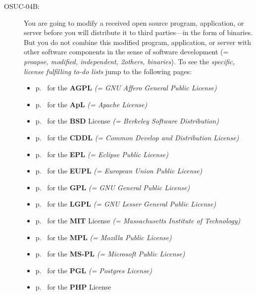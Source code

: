 \begin{description}
\item[OSUC-04B:]\label{OSUC-04B-DEF} You are going to modify a received open
source program, application, or server before you will distribute it to third
parties---in the form of binaries. But you do not combine this modified
program, application, or server with other software components in the sense of
software development (= \textit{proapse, modified, independent, 2others,
binaries}). To see the \textit{specific, license fulfilling to-do lists} jump to
the following pages:
  \begin{itemize}
    \item p.\ \pageref{OSUC-04B-AGPL} for the \textbf{AGPL}
      \textit{(= GNU Affero General Public License)} 
    \item p.\ \pageref{OSUC-04B-Apache20} for the \textbf{ApL}
      \textit{(= Apache License)}
    \item p.\ \pageref{OSUC-04B-BSD} for the \textbf{BSD} License
      \textit{(= Berkeley Software Distribution)}
    \item p.\ \pageref{OSUC-04B-CDDL} for the \textbf{CDDL}
      \textit{(= Common Develop and Distribution License)}  
    \item p.\ \pageref{OSUC-04B-EPL} for the \textbf{EPL}
      \textit{(= Eclipse Public License)}     
    \item p.\ \pageref{OSUC-04B-EUPL} for the \textbf{EUPL}
      \textit{(= European Union Public License)} 
    \item p.\ \pageref{OSUC-04B-GPL} for the \textbf{GPL}
       \textit{(= GNU General Public License)} 
    \item p.\ \pageref{OSUC-04B-LGPL} for the \textbf{LGPL}
      \textit{(= GNU Lesser General Public License)}           
    \item p.\ \pageref{OSUC-04B-MIT} for the \textbf{MIT} License
       \textit{(= Massachusetts Institute of Technology)} 
    \item p.\ \pageref{OSUC-04B-MPL} for the \textbf{MPL}
      \textit{(= Mozilla Public License)}     
    \item p.\ \pageref{OSUC-04B-MS-PL} for the \textbf{MS-PL}
      \textit{(= Microsoft Public License)} 
    \item p.\ \pageref{OSUC-04B-PGL} for the \textbf{PGL}
      \textit{(= Postgres License)} 
    \item p.\ \pageref{OSUC-04B-PHP} for the \textbf{PHP} License 
  \end{itemize}



\end{description}
